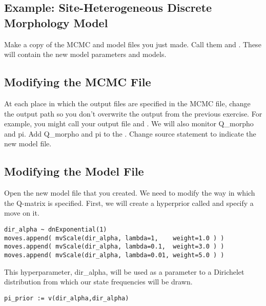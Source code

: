 \subsection{Example: Site-Heterogeneous Discrete Morphology Model }

{\begin{framed}
Make a copy of the MCMC and model files you just made. 
Call them  and . 
These will contain the new model parameters and models. \par 
\end{framed}}

\subsection{Modifying the MCMC File}

At each place in which the output files are specified in the MCMC file, change the output path so you don't overwrite the output from the previous exercise. 
For example, you might call your output file  and .
We will also monitor Q\_morpho and pi.
Add Q\_morpho and pi to the . 
Change source statement to indicate the new model file.

\subsection{Modifying the Model File}
Open the new model file that you created. We need to modify the way in which the Q-matrix is specified.
First, we will create a hyperprior called  and specify a move on it.
{\tt \begin{snugshade*}
\begin{lstlisting}
dir_alpha ~ dnExponential(1)
moves.append( mvScale(dir_alpha, lambda=1,    weight=1.0 ) )
moves.append( mvScale(dir_alpha, lambda=0.1,  weight=3.0 ) )
moves.append( mvScale(dir_alpha, lambda=0.01, weight=5.0 ) )
\end{lstlisting}
\end{snugshade*}}

This hyperparameter, dir\_alpha, will be used as a parameter to a Dirichelet distribution from which our state frequencies will be drawn.

{\tt \begin{snugshade*}
\begin{lstlisting}
pi_prior := v(dir_alpha,dir_alpha)
\end{lstlisting}
\end{snugshade*}}

